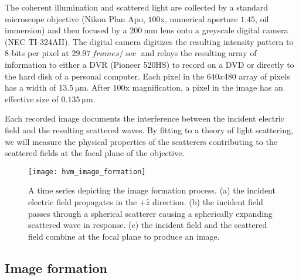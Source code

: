 The coherent illumination and scattered light are collected by a
standard microscope objective (Nikon Plan Apo, $\num{100}$x,
numerical aperture $\num{1.45}$, oil immersion) and then focused
by a $\SI{200}{\mm}$ lens onto a greyscale digital camera
(NEC TI-324AII). The digital camera digitizes the resulting intensity
pattern to $8$-bits per pixel at $\SI{29.97}{frames / \sec}$ and relays the
resulting array of information to either a DVR (Pioneer 520HS) to record
on a DVD or directly to the hard disk of a personal computer.
Each pixel in the $\si{640 x 480}$ array of pixels has a width of
$\SI{13.5}{\um}$. After $100$x magnification, a pixel in the
image has an effective size of $\SI{0.135}{\um}$.

Each recorded image documents the interference between the incident
electric field and the resulting scattered waves. By fitting
to a theory of light scattering, we will measure the physical
properties of the scatterers contributing to the scattered fields
at the focal plane of the objective.





\begin{figure}
  \centering
  \texttt{[image: hvm\_image\_formation]}
  \caption{A time series depicting the image formation process. (a) the incident
    electric field propagates in the $+\hat{z}$ direction. (b) the
    incident field passes through a spherical scatterer causing a
    spherically expanding scattered wave in response. (c) the incident
    field and the scattered field combine at the focal plane to produce
    an image.}
  \label{fig:image_formation}
\end{figure}


\subsection{Image formation}
\label{ch:hvm:sec:hvm:ssec:overview}

